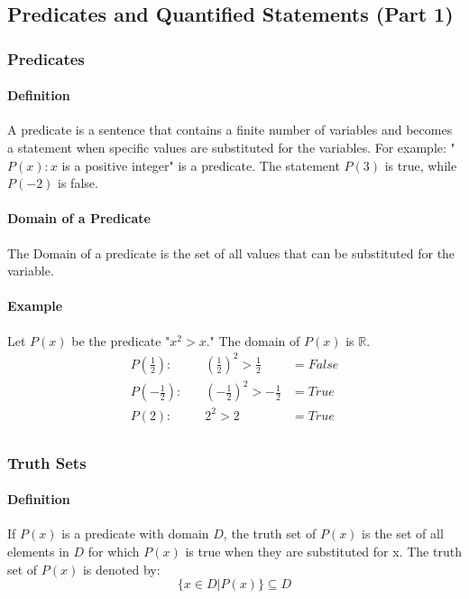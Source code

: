 \subsection{Predicates and Quantified Statements (Part 1)}
\hrulefill

\subsubsection*{Predicates}
\paragraph*{Definition}
A predicate is a sentence that contains a finite number of variables and becomes
a statement when specific values are substituted for the variables. For example: 
"$P(x): x$ is a positive integer" is a predicate. The statement $P(3)$ is true, while $P(-2)$ is false.

\paragraph*{Domain of a Predicate}
The Domain of a predicate is the set of all values that can be substituted for the
variable.

\paragraph*{Example}
Let $P(x)$ be the predicate "$x^2 > x$." The domain of $P(x)$ is $\mathbb{R}$.
\begin{align*}
    P(\frac{1}{2}): &\quad (\frac{1}{2})^2 > \frac{1}{2} &= False\\
    P(-\frac{1}{2}): &\quad (-\frac{1}{2})^2 > -\frac{1}{2} &= True\\
    P(2): &\quad 2^2 > 2 &= True\\
\end{align*}

\subsubsection*{Truth Sets}
\paragraph*{Definition}
If $P(x)$ is a predicate with domain $D$, the truth set of $P(x)$ is the set of all
elements in $D$ for which $P(x)$ is true when they are substituted for x. The truth 
set of $P(x)$ is denoted by:
\begin{equation*}
    \{x \in D | P(x)\} \subseteq D
\end{equation*}

